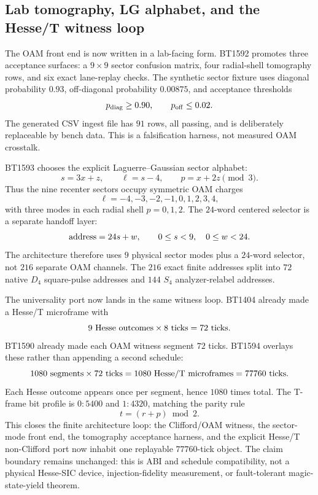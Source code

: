 \subsection{Lab tomography, LG alphabet, and the Hesse/T witness loop}
\label{sec:bt1592-bt1594-lab-mode-hesse-loop}

The OAM front end is now written in a lab-facing form.  BT1592 promotes three
acceptance surfaces: a \(9\times9\) sector confusion matrix, four radial-shell
tomography rows, and six exact lane-replay checks.  The synthetic sector fixture
uses diagonal probability \(0.93\), off-diagonal probability \(0.00875\), and
acceptance thresholds
\[
  p_{\rm diag}\ge 0.90,\qquad p_{\rm off}\le 0.02.
\]
The generated CSV ingest file has \(91\) rows, all passing, and is deliberately
replaceable by bench data.  This is a falsification harness, not measured OAM
crosstalk.

BT1593 chooses the explicit Laguerre--Gaussian sector alphabet:
\[
  s=3x+z,\qquad \ell=s-4,\qquad p=x+2z\pmod 3 .
\]
Thus the nine recenter sectors occupy symmetric OAM charges
\[
  \ell=-4,-3,-2,-1,0,1,2,3,4,
\]
with three modes in each radial shell \(p=0,1,2\).  The \(24\)-word centered
selector is a separate handoff layer:
\[
  {\rm address}=24s+w,\qquad 0\le s<9,\quad 0\le w<24.
\]
The architecture therefore uses \(9\) physical sector modes plus a \(24\)-word
selector, not \(216\) separate OAM channels.  The \(216\) exact finite addresses
split into \(72\) native \(D_4\) square-pulse addresses and \(144\) \(S_4\)
analyzer-relabel addresses.

The universality port now lands in the same witness loop.  BT1404 already made a
Hesse/T microframe with
\[
  9\ {\rm Hesse\ outcomes}\times 8\ {\rm ticks}=72\ {\rm ticks}.
\]
BT1590 already made each OAM witness segment \(72\) ticks.  BT1594 overlays these
rather than appending a second schedule:
\[
  1080\ {\rm segments}\times72\ {\rm ticks}
  =1080\ {\rm Hesse/T\ microframes}
  =77760\ {\rm ticks}.
\]
Each Hesse outcome appears once per segment, hence \(1080\) times total.  The
T-frame bit profile is \(0:5400\) and \(1:4320\), matching the parity rule
\[
  t=(r+p)\bmod 2.
\]
This closes the finite architecture loop: the Clifford/OAM witness, the
sector-mode front end, the tomography acceptance harness, and the explicit
Hesse/T non-Clifford port now inhabit one replayable \(77760\)-tick object.  The
claim boundary remains unchanged: this is ABI and schedule compatibility, not a
physical Hesse-SIC device, injection-fidelity measurement, or fault-tolerant
magic-state-yield theorem.
